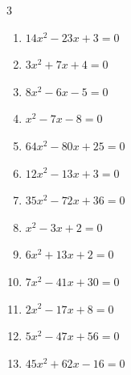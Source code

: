 \begin{multicols}{3}
\begin{enumerate}
  \item $14x^{2}-23x+3=0$


\columnbreak %

  \item $3x^{2}+7x+4=0$


  \item $8x^{2}-6x-5=0$


  \item $x^{2}-7x-8=0$

        \phantom{$\displaystyle x=8,\; -1$}

  \item $64x^{2}-80x+25=0$


  \item $12x^{2}-13x+3=0$


  \item $35x^{2}-72x+36=0$


  \item $x^{2}-3x+2=0$

        \phantom{$\displaystyle x=1,\; 2$}

  \item $6x^{2}+13x+2=0$


  \item $7x^{2}-41x+30=0$


  \item $2x^{2}-17x+8=0$


\columnbreak %

\resetques

  \item $5x^{2}-47x+56=0$


  \item $45x^{2}+62x-16=0$


\end{enumerate}
\end{multicols}
